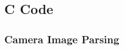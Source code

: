 \subsection{C Code}
\subsubsection{Camera Image Parsing} \label{camTestC}
\singlespacing

\doublespacing